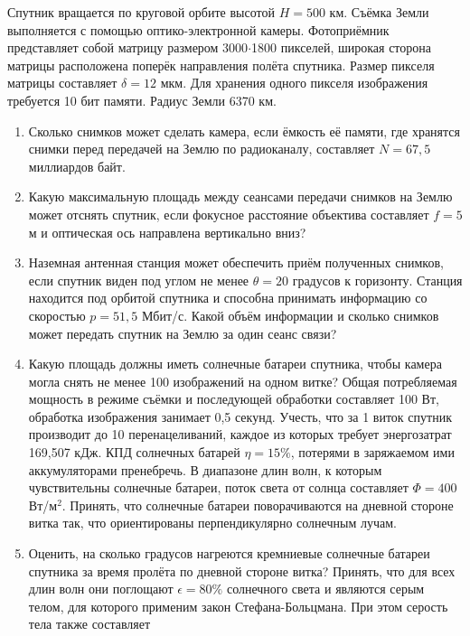 

Спутник вращается по круговой орбите высотой $H=500$ км. Съёмка Земли выполняется с помощью оптико-электронной 
камеры. Фотоприёмник представляет собой матрицу размером 3000$\cdot$1800 пикселей, широкая сторона матрицы 
расположена поперёк направления полёта спутника. Размер пикселя матрицы составляет $\delta=12$ мкм. Для хранения 
одного пикселя изображения требуется 10 бит памяти. Радиус Земли 6370 км.

\begin{enumerate}
    \item Сколько снимков может сделать камера, если ёмкость её памяти, где хранятся снимки перед передачей на 
    Землю по радиоканалу,  составляет $N=67,5$ миллиардов байт.
    \item Какую максимальную площадь между сеансами передачи снимков на Землю может отснять спутник, если 
    фокусное расстояние объектива составляет $f=5$ м и оптическая ось направлена вертикально вниз?
    \item Наземная антенная станция может обеспечить приём полученных снимков, если спутник виден под углом не 
    менее $\theta=20$ градусов к горизонту. Станция находится под орбитой спутника и способна принимать информацию 
    со скоростью $p=51,5$ Мбит/с. Какой объём информации и сколько снимков может передать спутник на Землю за 
    один сеанс связи? 
    \item Какую площадь должны иметь солнечные батареи спутника, чтобы камера могла снять не менее 100 
    изображений на одном витке? Общая потребляемая мощность в режиме съёмки и последующей обработки составляет 
    100 Вт, обработка изображения занимает 0,5 секунд. Учесть, что за 1 виток спутник производит до 10 
    перенацеливаний, каждое из которых требует энергозатрат 169,507 кДж. КПД солнечных батарей $\eta=15\%$, 
    потерями в заряжаемом ими аккумуляторами пренебречь. В диапазоне длин волн, к которым чувствительны солнечные 
    батареи, поток света от солнца составляет $\Phi=400$ Вт/м$^2$. Принять, что солнечные батареи поворачиваются на 
    дневной стороне витка так, что ориентированы перпендикулярно солнечным лучам.
    \item Оценить, на сколько градусов нагреются кремниевые солнечные батареи спутника за время пролёта по 
    дневной стороне витка? Принять, что для всех длин волн они поглощают $\epsilon=80\%$ солнечного света и 
    являются серым телом, для которого применим закон Стефана-Больцмана. При этом серость тела также составляет 

\end{enumerate}
